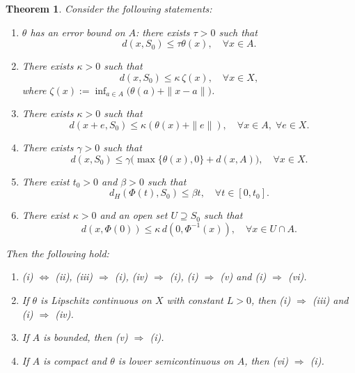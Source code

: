 \documentclass[10pt,a4paper]{amsart}
\newtheorem{theorem}{Theorem}
\begin{document}
\begin{theorem} \label{XLWCJK}  Consider the following statements:
	\begin{enumerate}
		\item[(i)] $\theta$ has an error bound on $A$: there exists $\tau>0$ such that
		\begin{equation}\label{EBAQJ11} 
			d(x,S_0)\le\tau \theta(x), \quad  \forall x\in A.
		\end{equation}		 
		
		\item[(ii)]  There exists   \(\kappa > 0\) such that  
		$$			d(x, S_0) \le \kappa \, \zeta(x), \quad \forall x \in X, 		$$
		where  $\zeta(x) := \inf_{a \in A} \bigl( \theta(a) + \|x - a\| \bigr)$.
		
		\item[(iii)]  There exists \(\kappa > 0\) such that  
		\begin{equation}\label{EBkkQJ} 
			d(x+e, S_0) \le \kappa (\theta(x) + \|e\|),  \quad  \forall x \in A, \;    \forall e \in X.
		\end{equation}	
		
		\item[(iv)]  There exists  $\gamma>0$ such that  
		\begin{equation}\label{EBkXJ} 
			d(x,S_0)\le \gamma\bigl(\max\{\theta(x),0\}+d(x, A)\bigr),\quad \forall x\in X .
		\end{equation}	
		
		\item[(v)] There exist \(t_0 > 0\) and \(\beta > 0\) such that 
		\[
		d_H(\Phi(t), S_0) \le \beta t,  \quad  \forall t \in [0, t_0].
		\]
		
		\item[(vi)] There exist $\kappa>0$ and an open set $U\supseteq S_0$ such that \begin{equation}\label{EBkmJ} 
			d(x,\Phi(0))\le\kappa\,d(0,\Phi^{-1}(x)),       \quad  \forall       x\in U\cap A. 	
		\end{equation}	 
	\end{enumerate}
	Then the following hold:
	\begin{enumerate}
		\item      (i) $\Leftrightarrow$ (ii), (iii) $\Rightarrow$ (i), (iv) $\Rightarrow$ (i),  (i) $\Rightarrow$ (v) and (i) $\Rightarrow$ (vi). 
		\item  If $\theta$ is Lipschitz continuous on $X$ with constant $L>0$,
		then (i) $\Rightarrow$ (iii) and (i) $\Rightarrow$ (iv).
		\item  If $A$ is bounded, then (v) $\Rightarrow$ (i).
		\item  	If $A$ is compact  and $\theta$ is lower semicontinuous on $A$, then (vi) $\Rightarrow$ (i).  
	\end{enumerate}
\end{theorem}
\end{document}
